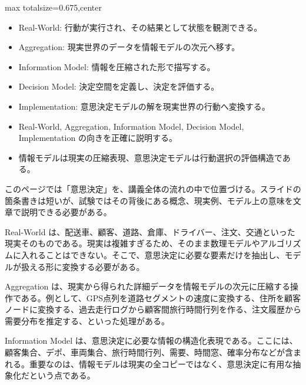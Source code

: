 \clearpage
{}
\begin{adjustbox}{max totalsize={\textwidth}{0.675\textheight},center}
\begin{minipage}{\textwidth}\scriptsize
\begin{minipage}[t]{0.485\textwidth}
\begin{itemize}
\item Real-World: 行動が実行され、その結果として状態を観測できる。
\item Aggregation: 現実世界のデータを情報モデルの次元へ移す。
\item Information Model: 情報を圧縮された形で描写する。
\item Decision Model: 決定空間を定義し、決定を評価する。
\item Implementation: 意思決定モデルの解を現実世界の行動へ変換する。
\end{itemize}
\begin{itemize}
\item Real-World, Aggregation, Information Model, Decision Model, Implementation の向きを正確に説明する。
\item 情報モデルは現実の圧縮表現、意思決定モデルは行動選択の評価構造である。
\end{itemize}
\end{minipage}\hfill
\begin{minipage}[t]{0.485\textwidth}
このページでは「意思決定」を、講義全体の流れの中で位置づける。スライドの箇条書きは短いが、試験ではその背後にある概念、現実例、モデル上の意味を文章で説明できる必要がある。\par
Real-World は、配送車、顧客、道路、倉庫、ドライバー、注文、交通といった現実そのものである。現実は複雑すぎるため、そのまま数理モデルやアルゴリズムに入れることはできない。そこで、意思決定に必要な要素だけを抽出し、モデルが扱える形に変換する必要がある。\par
Aggregation は、現実から得られた詳細データを情報モデルの次元に圧縮する操作である。例として、GPS点列を道路セグメントの速度に変換する、住所を顧客ノードに変換する、過去走行ログから顧客間旅行時間行列を作る、注文履歴から需要分布を推定する、といった処理がある。\par
Information Model は、意思決定に必要な情報の構造化表現である。ここには、顧客集合、デポ、車両集合、旅行時間行列、需要、時間窓、確率分布などが含まれる。重要なのは、情報モデルは現実の全コピーではなく、意思決定に有用な抽象化だという点である。\par

\end{minipage}
\end{minipage}
\end{adjustbox}
